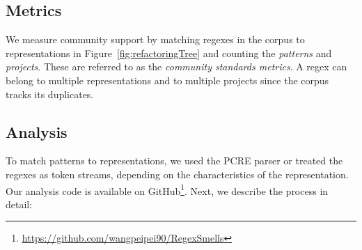 \subsection{Metrics}
\label{sec:communitymetric}
We measure community support by matching regexes in the corpus to representations in Figure~\ref{fig:refactoringTree} and counting the \emph{patterns} and \emph{projects}. These are referred to as the \emph{community standards metrics}.
A regex can belong to multiple representations and to multiple projects since the corpus tracks its duplicates.

%
%






\subsection{Analysis}
\label{communityanalysis}
To match patterns to representations, we used the PCRE parser or treated the regexes as token streams, depending on the characteristics of the representation. Our analysis code is available on GitHub\footnote{\url{https://github.com/wangpeipei90/RegexSmells}}.
Next, we describe the process in detail:

